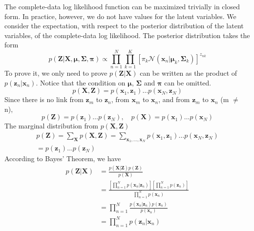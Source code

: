 \documentclass[5p,sort&compress]{elsarticle}
\begin{document}
The complete-data log likelihood function can be maximized trivially in closed form. In practice, however, we do not have values for the latent variables. We consider the expectation, with respect to the posterior distribution of the latent variables, of the complete-data log likelihood. The posterior distribution takes the form
\begin{equation}
p(\mathbf{Z} | \mathbf{X}, \boldsymbol{\mu}, \boldsymbol{\Sigma}, \boldsymbol{\pi}) \propto \prod_{n=1}^{N} \prod_{k=1}^{K}\left[\pi_{k} \mathcal{N}\left(\mathbf{x}_{n} | \boldsymbol{\mu}_{k}, \boldsymbol{\Sigma}_{k}\right)\right]^{z_{n k}}
\end{equation}
To prove it, we only need to prove $p(\mathbf{Z}|\mathbf{X})$ can be written as the product of $p(\mathbf{z}_n | \mathbf{x}_n)$. Notice that the condition on $\boldsymbol{\mu}$, $\boldsymbol{\Sigma}$ and $\boldsymbol{\pi}$ can be omitted.
\begin{equation}
p(\mathbf{X}, \mathbf{Z})=p\left(\mathbf{x}_{1}, \mathbf{z}_{1}\right) \ldots p\left(\mathbf{x}_{N}, \mathbf{z}_{N}\right)
\end{equation}
Since there is no link from $\mathbf{z}_m$ to $\mathbf{z}_n$, from $\mathbf{x}_m$ to $\mathbf{x}_n$, and from $\mathbf{z}_m$ to $\mathbf{x}_n$ (m $\neq$ n),
\begin{equation}
p(\mathbf{Z})=p\left(\mathbf{z}_{1}\right) \ldots p\left(\mathbf{z}_{N}\right), \quad p(\mathbf{X})=p\left(\mathbf{x}_{1}\right) \ldots p\left(\mathbf{x}_{N}\right)
\end{equation}
The marginal distribution from $p(\mathbf{X}, \mathbf{Z})$
\begin{equation}
\begin{aligned}
p(\mathbf{Z})=\sum_{\mathbf{X}} p(\mathbf{X}, \mathbf{Z})=\sum_{\mathbf{x}_{1}, \ldots, \mathbf{x}_{N}} p\left(\mathbf{x}_{1}, \mathbf{z}_{1}\right) \ldots p\left(\mathbf{x}_{N}, \mathbf{z}_{N}\right) \\
=p\left(\mathbf{z}_{1}\right) \ldots p\left(\mathbf{z}_{N}\right)
\end{aligned}
\end{equation}
According to Bayes' Theorem, we have
\begin{equation}
\begin{aligned} p(\mathbf{Z} | \mathbf{X}) &=\frac{p(\mathbf{X} | \mathbf{Z}) p(\mathbf{Z})}{p(\mathbf{X})} \\ &=\frac{\left[\prod_{n=1}^{N} p\left(\mathbf{x}_{n} | \mathbf{z}_{n}\right)\right]\left[\prod_{n=1}^{N} p\left(\mathbf{z}_{n}\right)\right]}{\prod_{n=1}^{N} p\left(\mathbf{x}_{n}\right)} \\ &=\prod_{n=1}^{N} \frac{p\left(\mathbf{x}_{n} | \mathbf{z}_{n}\right) p\left(\mathbf{z}_{n}\right)}{p\left(\mathbf{x}_{n}\right)} \\ &=\prod_{n=1}^{N} p\left(\mathbf{z}_{n} | \mathbf{x}_{n}\right) \end{aligned}
\end{equation}
\end{document}
